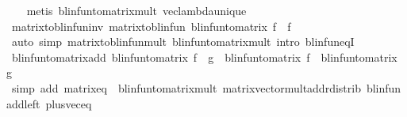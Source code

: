 \begin{isabellebody}
%
\isadelimproof
\ \ %
\endisadelimproof
%
\isatagproof
{}\isamarkupfalse%
\ {\isacharparenleft}{\kern0pt}metis\ blinfun{\isacharunderscore}{\kern0pt}to{\isacharunderscore}{\kern0pt}matrix{\isacharunderscore}{\kern0pt}mult{\isacharprime}{\kern0pt}\ vec{\isacharunderscore}{\kern0pt}lambda{\isacharunderscore}{\kern0pt}unique{\isacharparenright}{\kern0pt}%
\endisatagproof
{\isafoldproof}%
%
\isadelimproof
\isanewline
%
\endisadelimproof
\isanewline
{}\isamarkupfalse%
\ matrix{\isacharunderscore}{\kern0pt}to{\isacharunderscore}{\kern0pt}blinfun{\isacharunderscore}{\kern0pt}inv{\isacharcolon}{\kern0pt}\ {\isachardoublequoteopen}matrix{\isacharunderscore}{\kern0pt}to{\isacharunderscore}{\kern0pt}blinfun\ {\isacharparenleft}{\kern0pt}blinfun{\isacharunderscore}{\kern0pt}to{\isacharunderscore}{\kern0pt}matrix\ f{\isacharparenright}{\kern0pt}\ {\isacharequal}{\kern0pt}\ f{\isachardoublequoteclose}\isanewline
%
\isadelimproof
\ \ %
\endisadelimproof
%
\isatagproof
{}\isamarkupfalse%
\ {\isacharparenleft}{\kern0pt}auto\ simp{\isacharcolon}{\kern0pt}\ matrix{\isacharunderscore}{\kern0pt}to{\isacharunderscore}{\kern0pt}blinfun{\isacharunderscore}{\kern0pt}mult\ blinfun{\isacharunderscore}{\kern0pt}to{\isacharunderscore}{\kern0pt}matrix{\isacharunderscore}{\kern0pt}mult\ intro{\isacharbang}{\kern0pt}{\isacharcolon}{\kern0pt}\ blinfun{\isacharunderscore}{\kern0pt}eqI{\isacharparenright}{\kern0pt}%
\endisatagproof
{\isafoldproof}%
%
\isadelimproof
\isanewline
%
\endisadelimproof
\isanewline
{}\isamarkupfalse%
\ blinfun{\isacharunderscore}{\kern0pt}to{\isacharunderscore}{\kern0pt}matrix{\isacharunderscore}{\kern0pt}add{\isacharcolon}{\kern0pt}\ {\isachardoublequoteopen}blinfun{\isacharunderscore}{\kern0pt}to{\isacharunderscore}{\kern0pt}matrix\ {\isacharparenleft}{\kern0pt}f\ {\isacharplus}{\kern0pt}\ g{\isacharparenright}{\kern0pt}\ {\isacharequal}{\kern0pt}\ blinfun{\isacharunderscore}{\kern0pt}to{\isacharunderscore}{\kern0pt}matrix\ f\ {\isacharplus}{\kern0pt}\ blinfun{\isacharunderscore}{\kern0pt}to{\isacharunderscore}{\kern0pt}matrix\ g{\isachardoublequoteclose}\isanewline
%
\isadelimproof
\ \ %
\endisadelimproof
%
\isatagproof
{}\isamarkupfalse%
\ {\isacharparenleft}{\kern0pt}simp\ add{\isacharcolon}{\kern0pt}\ matrix{\isacharunderscore}{\kern0pt}eq\ \ blinfun{\isacharunderscore}{\kern0pt}to{\isacharunderscore}{\kern0pt}matrix{\isacharunderscore}{\kern0pt}mult{\isacharprime}{\kern0pt}{\isacharprime}{\kern0pt}\ matrix{\isacharunderscore}{\kern0pt}vector{\isacharunderscore}{\kern0pt}mult{\isacharunderscore}{\kern0pt}add{\isacharunderscore}{\kern0pt}rdistrib\ blinfun{\isachardot}{\kern0pt}add{\isacharunderscore}{\kern0pt}left\ plus{\isacharunderscore}{\kern0pt}vec{\isacharunderscore}{\kern0pt}eq{\isacharparenright}{\kern0pt}%

\end{isabellebody}
